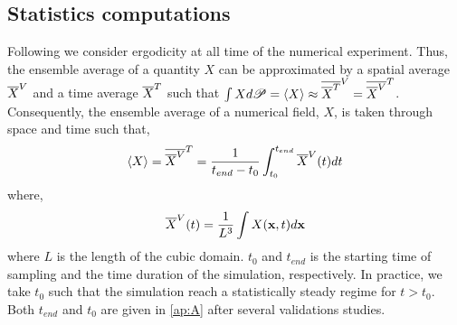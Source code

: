 \subsection{Statistics computations}

Following \citet{du2022analysis} we consider ergodicity at all time of the numerical experiment.
Thus, the ensemble average of a quantity $X$ can be approximated by a spatial average $\overline{X}^V$ and a time average $\overline{X}^T$ such that $\int X d\mathscr{P} = \left<X\right> \approx \overline{\overline{X}^T}^V = \overline{\overline{X}^V}^T$.
Consequently, the ensemble average of a numerical field, $X$, is taken through space and time such that,
\begin{equation}
    \left<X\right>
    = \overline{\overline{X}^V}^T
    = \frac{1}{ t_{end} - t_0}\int_{t_0}^{t_{end}} 
    \overline{X}^V(t) dt
\end{equation}
where, 
\begin{equation}
    \overline{X}^V(t)
    = \frac{1}{L^3}\int 
    X(\textbf{x},t) d\textbf{x}
\end{equation}
where $L$ is the length of the cubic domain.
$t_0$ and $t_{end}$ is the starting time of sampling and the time duration of the simulation, respectively.
In practice, we take $t_0$ such that the simulation reach a statistically steady regime for $t>t_0$.  
Both $t_{end} $ and $t_0$ are given in \ref{ap:A} after several validations studies. 


